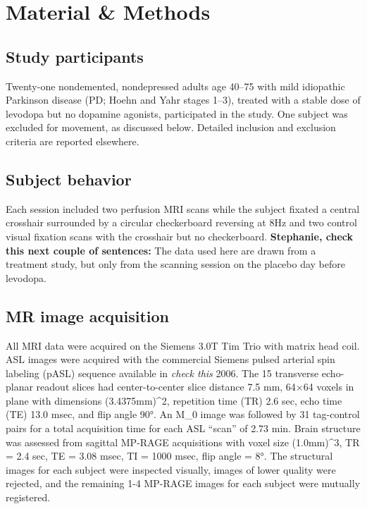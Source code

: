 \section{Material \& Methods}

\subsection{Study participants}
Twenty-one nondemented, nondepressed adults age 40–75 with mild idiopathic Parkinson disease (PD; Hoehn and Yahr stages 1–3),\cite{6067254} treated with a stable dose of levodopa but no dopamine agonists, participated in the study. One subject was excluded for movement, as discussed below. Detailed inclusion and exclusion criteria are reported elsewhere.\cite{Black_2010}

\subsection{Subject behavior}
Each session included two perfusion MRI scans while the subject fixated a central crosshair surrounded by a circular checkerboard reversing at 8Hz and two control visual fixation scans with the crosshair but no checkerboard. \textbf{Stephanie, check this next couple of sentences:} The data used here are drawn from a treatment study,\cite{Black_2010} but only from the scanning session on the placebo day before levodopa. 

\subsection{MR image acquisition}
All MRI data were acquired on the Siemens 3.0T Tim Trio with matrix head coil. ASL images were acquired with the commercial Siemens pulsed arterial spin labeling (pASL) sequence available in \textit{check this} 2006.\cite{Wang_2003} The 15 transverse echo-planar readout slices had center-to-center slice distance 7.5 mm, 64×64 voxels in plane with dimensions (3.4375mm)^2, repetition time (TR) 2.6 sec, echo time (TE) 13.0 msec, and flip angle 90°. An M_0 image was followed by 31 tag-control pairs for a total acquisition time for each ASL “scan” of 2.73 min. Brain structure was assessed from sagittal MP-RAGE acquisitions with voxel size (1.0mm)^3, TR = 2.4 sec, TE = 3.08 msec, TI = 1000 msec, flip angle = 8°. The structural images for each subject were inspected visually, images of lower quality were rejected, and the remaining 1-4 MP-RAGE images for each subject were mutually registered.

